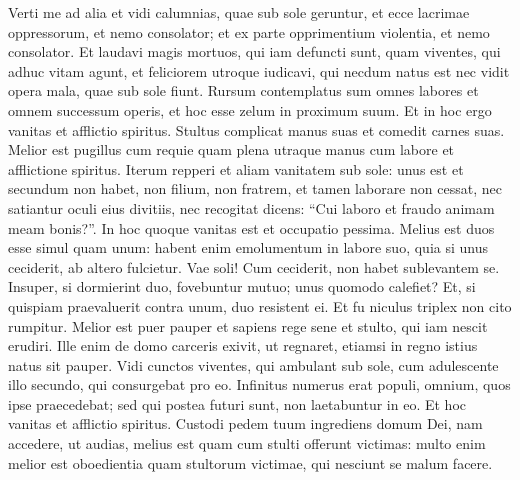 \begin{biblechapter}  
\verse Verti me ad alia et vidi calumnias, quae sub sole geruntur, et ecce lacrimae oppressorum, et nemo consolator; et ex parte opprimentium violentia, et nemo consolator. 
\verse Et laudavi magis mortuos, qui iam defuncti sunt, quam viventes, qui adhuc vitam agunt, 
\verse et feliciorem utroque iudicavi, qui necdum natus est nec vidit opera mala, quae sub sole fiunt. 
\verse Rursum contemplatus sum omnes labores et omnem successum operis, et hoc esse zelum in proximum suum. Et in hoc ergo vanitas et afflictio spiritus. 
\verse Stultus complicat manus suas et comedit carnes suas. 
\verse Melior est pugillus cum requie quam plena utraque manus cum labore et afflictione spiritus. 
\verse Iterum repperi et aliam vanitatem sub sole: 
\verse unus est et secundum non habet, non filium, non fratrem, et tamen laborare non cessat, nec satiantur oculi eius divitiis, nec recogitat dicens: “Cui laboro et fraudo animam meam bonis?”. In hoc quoque vanitas est et occupatio pessima. 
\verse Melius est duos esse simul quam unum: habent enim emolumentum in labore suo, 
\verse quia si unus ceciderit, ab altero fulcietur. Vae soli! Cum ceciderit, non habet sublevantem se. 
\verse Insuper, si dormierint duo, fovebuntur mutuo; unus quomodo calefiet?  
\verse Et, si quispiam praevaluerit contra unum, duo resistent ei. Et fu niculus triplex non cito rumpitur. 
\verse Melior est puer pauper et sapiens rege sene et stulto, qui iam nescit erudiri. 
\verse Ille enim de domo carceris exivit, ut regnaret, etiamsi in regno istius natus sit pauper. 
\verse Vidi cunctos viventes, qui ambulant sub sole, cum adulescente illo secundo, qui consurgebat pro eo. 
\verse Infinitus numerus erat populi, omnium, quos ipse praecedebat; sed qui postea futuri sunt, non laetabuntur in eo. Et hoc vanitas et afflictio spiritus. 
\verse Custodi pedem tuum ingrediens domum Dei, nam accedere, ut audias, melius est quam cum stulti offerunt victimas: multo enim melior est oboedientia quam stultorum victimae, qui nesciunt se malum facere. 
\end{biblechapter}

